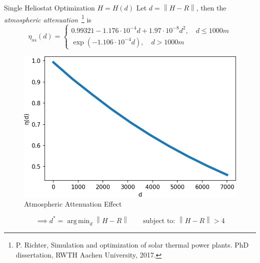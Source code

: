 \documentclass[10pt, xcolor={dvipsnames}]{beamer}
\DeclareMathOperator*{\argmin}{arg\,min}
\newcommand{\norm}[1]{\left\lVert#1\right\rVert}
\begin{document}
\begin{frame}{Single Heliostat Optimization $H = H(d)$}
Let $d = \norm{H - R}$, then the {\it atmospheric attenuation}~\footnote{{\tiny \color{blue} P. Richter, Simulation and optimization of solar thermal power plants. PhD dissertation, RWTH Aachen University, 2017.}} is
\begin{equation}
\eta_{\text{aa}}(d) = \begin{cases}
0.99321 - 1.176 \cdot 10^{-4} d + 1.97 \cdot 10^{-8} d^{2}, \quad d \leq 1000 m\\
\exp(-1.106 \cdot 10^{-4} d), \quad d > 1000 m
\end{cases}
\end{equation}
\begin{center}
\begin{figure}
\includegraphics[width=.5\textwidth]{../figures/AA-crop.png}
\caption{Atmospheric Attenuation Effect}
\end{figure}
\end{center}
$$\implies d^{*} = \argmin_{d} \norm{H - R} \qquad \text{subject to: } \norm{H - R} > 4$$
\end{frame}
\end{document}
